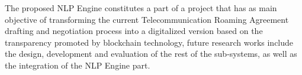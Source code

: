 \documentclass[conference]{style/IEEEtran}
\begin{document}
The proposed NLP Engine constitutes a part of a project that has as main objective of transforming the current Telecommunication Roaming Agreement drafting and negotiation process into a digitalized version based on the transparency promoted by blockchain technology, future research works include the design, development and evaluation of the rest of the sub-systems, as well as the integration of the NLP Engine part.

\printbibliography

\vspace{12pt}
\end{document}
